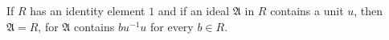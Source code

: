 If $R$ has an identity element $1$ and if an ideal $\mathfrak{A}$ in $R$ contains a unit $u$, then $\mathfrak{A} = R$, for $\mathfrak{A}$ contains $bu^{-1}u$ for every $b \in R$.
